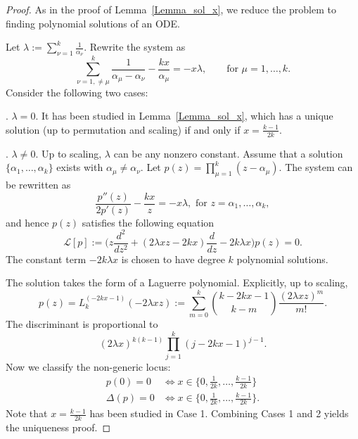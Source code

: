 \documentclass[11pt]{amsart}
\theoremstyle{remark}
\numberwithin{equation}{section}
\begin{document}
\begin{proof}
As in the proof of Lemma~\ref{Lemma_sol_x}, we reduce the problem to finding polynomial solutions of an ODE. 

Let $\lambda := \sum_{\nu=1}^k \frac{1}{\alpha_\nu}$. Rewrite the system as
\[
    \sum_{\nu=1, \neq \mu}^k \frac{1}{\alpha_{\mu} - \alpha_{\nu}} - \frac{kx}{\alpha_{\mu}} = -x \lambda, \qquad \mbox{for $\mu =1 ,\dots,k$}.
\]
Consider the following two cases:

. $\lambda =0$. 
It has been studied in Lemma~\ref{Lemma_sol_x}, which has a unique solution (up to permutation and scaling) if and only if $x = \frac{k-1}{2k}$.

. $\lambda \neq 0$. Up to scaling, $\lambda$ can be any nonzero constant.
Assume that a solution $\{ \alpha_1,\dots,\alpha_k \}$ exists with $\alpha_\mu\neq \alpha_\nu$.
Let $p(z) = \prod_{\mu=1}^k (z- \alpha_\mu)$. The system can be rewritten as
\[
    \frac{p''(z)}{2p'(z)} - \frac{kx}{z} = -x \lambda, \text{ for }z=\alpha_1,\dots,\alpha_k,
\]
and hence $p(z)$ satisfies the following equation 
\begin{equation} \label{eqn_sol_x}
    \mathcal{L}[p] := \Big( z \frac{d^2}{dz^2} + (2\lambda x z-2kx) \frac{d}{dz} - 2k\lambda x \Big) p(z) =0.
\end{equation}
The constant term $-2k\lambda x$ is chosen to have degree $k$ polynomial solutions. 

The solution takes the form of a Laguerre polynomial. Explicitly, up to scaling,
\[
    p(z) = L_k^{(-2kx-1)}(-2\lambda xz) :=  \sum_{m=0}^k \binom{k - 2kx - 1}{k - m} \frac{(2\lambda xz)^m}{m!}.
\]
The discriminant is proportional to
\[
(2\lambda x)^{k(k-1)} \prod_{j=1}^k (j - 2kx - 1)^{j-1}. 
\]
Now we classify the non-generic locus:
\[
\begin{split}
    p(0) =0 &\Leftrightarrow x \in \{ 0, \frac{1}{2k}, \dots, \frac{k-1}{2k} \}
    \\
    \Delta(p) =0 &\Leftrightarrow x \in \{ 0, \frac{1}{2k}, \dots, \frac{k-1}{2k} \}. 
\end{split}
\]
Note that $x = \frac{k-1}{2k}$ has been studied in Case 1. Combining Cases 1 and 2 yields the uniqueness proof. 


\end{proof}
\end{document}
